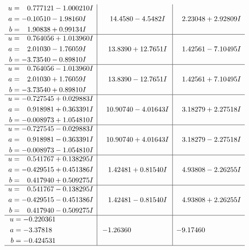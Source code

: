 \documentclass[1p]{elsarticle_modified}
\theoremstyle{definition}
\begin{document}
$$\begin{array}{c|c|c}
\begin{aligned}
u &= \phantom{-}0.777121 - 1.000210 I \\
a &= -0.10510 - 1.98160 I \\
b &= \phantom{-}1.90838 + 0.99134 I\end{aligned}
 & \phantom{-}14.4580 - 4.5482 I & \phantom{-}2.23048 + 2.92809 I \\ \hline\begin{aligned}
u &= \phantom{-}0.764056 + 1.013960 I \\
a &= \phantom{-}2.01030 - 1.76059 I \\
b &= -3.73540 - 0.89810 I\end{aligned}
 & \phantom{-}13.8390 + 12.7651 I & \phantom{-}1.42561 - 7.10495 I \\ \hline\begin{aligned}
u &= \phantom{-}0.764056 - 1.013960 I \\
a &= \phantom{-}2.01030 + 1.76059 I \\
b &= -3.73540 + 0.89810 I\end{aligned}
 & \phantom{-}13.8390 - 12.7651 I & \phantom{-}1.42561 + 7.10495 I \\ \hline\begin{aligned}
u &= -0.727545 + 0.029883 I \\
a &= \phantom{-}0.918981 + 0.363391 I \\
b &= -0.008973 + 1.054810 I\end{aligned}
 & \phantom{-}10.90740 - 4.01643 I & \phantom{-}3.18279 + 2.27518 I \\ \hline\begin{aligned}
u &= -0.727545 - 0.029883 I \\
a &= \phantom{-}0.918981 - 0.363391 I \\
b &= -0.008973 - 1.054810 I\end{aligned}
 & \phantom{-}10.90740 + 4.01643 I & \phantom{-}3.18279 - 2.27518 I \\ \hline\begin{aligned}
u &= \phantom{-}0.541767 + 0.138295 I \\
a &= -0.429515 + 0.451386 I \\
b &= \phantom{-}0.417940 + 0.509275 I\end{aligned}
 & \phantom{-}1.42481 + 0.81540 I & \phantom{-}4.93808 - 2.26255 I \\ \hline\begin{aligned}
u &= \phantom{-}0.541767 - 0.138295 I \\
a &= -0.429515 - 0.451386 I \\
b &= \phantom{-}0.417940 - 0.509275 I\end{aligned}
 & \phantom{-}1.42481 - 0.81540 I & \phantom{-}4.93808 + 2.26255 I \\ \hline\begin{aligned}
u &= -0.220361\phantom{ +0.000000I} \\
a &= -3.37818\phantom{ +0.000000I} \\
b &= -0.424531\phantom{ +0.000000I}\end{aligned}
 & -1.26360\phantom{ +0.000000I} & -9.17460\phantom{ +0.000000I}\\
 \hline 
 \end{array}$$\newpage\newpage\renewcommand{\arraystretch}{1}
\end{document}
